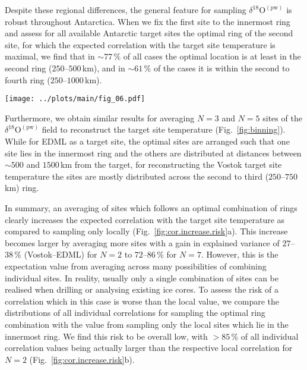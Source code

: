 \documentclass[cp, manuscript]{copernicus}
\begin{document}
Despite these regional differences, the general feature for sampling
$\delta^{18}\mathrm{O}^{\mathrm{(pw)}}$ is robust throughout
Antarctica. When we fix the first site to the innermost ring and assess for all
available Antarctic target sites the optimal ring of the second site, for which
the expected correlation with the target site temperature is maximal, we find
that in $\sim77\,\%$ of all cases the optimal location is at least in the second
ring ($250$--$500$\,km), and in $\sim61\,\%$ of the cases it is within the
second to fourth ring ($250$--$1000$\,km).

\begin{figure*}[t]%
\centering
\texttt{[image: ../plots/main/fig\_06.pdf]}
\caption{%
  The optimal arrangement for averaging three or five
  $\delta^{18}\mathrm{O}^{\mathrm{(pw)}}$ ice cores to reconstruct the target
  site temperature at the EDML (\textbf{a}, \textbf{c}) and Vostok (\textbf{b},
  \textbf{d}) drilling sites. Displayed are the optimal five of all possible
  combinations of rings, i.e. those which exhibit the highest mean
  correlation across $10^5$ random trials of averaging $N=3$ (\textbf{c},
  \textbf{d}) or $N=5$ (\textbf{a}, \textbf{b}) grid cells from these rings.}
\label{fig:binning}%
\end{figure*}%

Furthermore, we obtain similar results for averaging $N=3$ and $N=5$ sites of
the $\delta^{18}\mathrm{O}^{\mathrm{(pw)}}$ field to reconstruct the target site
temperature (Fig.~\ref{fig:binning}). While for EDML as a target site, the
optimal sites are arranged such that one site lies in the innermost ring and the
others are distributed at distances between $\sim500$ and $1500$\,km from the
target, for reconstructing the Vostok target site temperature the sites are
mostly distributed across the second to third ($250$--$750$\,km) ring.

In summary, an averaging of sites which follows an optimal combination of
rings clearly increases the expected correlation with the target site
temperature as compared to sampling only locally
(Fig.~\ref{fig:cor.increase.risk}a). This increase becomes larger by averaging
more sites with a gain in explained variance of $27$--$38\,\%$ (Vostok--EDML)
for $N=2$ to $72$--$86\,\%$ for $N=7$. However, this is the expectation value
from averaging across many possibilities of combining individual sites. In
reality, usually only a single combination of sites can be realised when
drilling or analysing existing ice cores. To assess the risk of a correlation
which in this case is worse than the local value, we compare the distributions
of all individual correlations for sampling the optimal ring combination with
the value from sampling only the local sites which lie in the innermost ring. We
find this risk to be overall low, with $>85\,\%$ of all individual correlation
values being actually larger than the respective local correlation for $N=2$
(Fig.~\ref{fig:cor.increase.risk}b).
\end{document}
